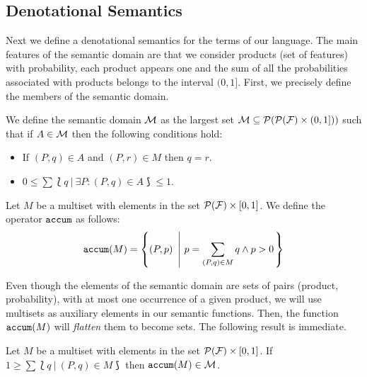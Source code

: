 \subsection{Denotational Semantics}
\label{sec:stat:den}

Next we define a denotational semantics for the terms of our language. The main features of the semantic domain are that we consider products (set of features) with probability,
each product appears one and the sum of all the probabilities
associated with products belongs to the interval $(0,1]$. First, we
precisely define the members of the semantic domain.


\bdfn\label{def:den:pr}
We define the semantic domain ${\cal M}$ as the largest set ${\cal M}\subseteq{\cal P}({\cal P}({\cal F})\times
  (0,1]))$ such that if $A\in{\cal M}$ then the following
  conditions hold:
  \begin{itemize}
  \item If $(P,q)\in A$ and $(P,r)\in M$ then $q=r$.
  \item $0\leq \sum \lbag q \ | \ \exists P: (P,q)\in A\rbag \leq 1$.
  \end{itemize}


Let $M$ be a multiset  with elements in the set ${\cal P}({\cal F})\times [0,1]$.
We define the operator $\mathtt{accum}$ as follows:
  $$\accum(M) = \left\{(P,p)\ \left| \ p=\sum_{(P,q)\in M}q \wedge p>0\right. \right\}$$
\edfn

Even though the elements of the semantic domain are sets of pairs (product, probability), with at most one occurrence of a given product, we will use multisets as auxiliary elements in our semantic functions. Then, the function $\mathtt{accum}(M)$ will \emph{flatten} them to become sets.
The following result is immediate.

\bprop\label{prop:pr:accum}
 Let $M$ be a multiset with elements in the set ${\cal P}({\cal F})\times
 [0,1]$. If $1\geq\sum\lbag q\ |\ (P,q)\in M\rbag$
 then $\mathtt{accum}(M)\in{\cal M}$.
\eprop


